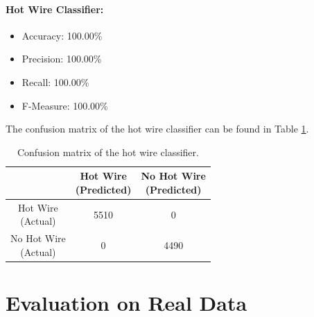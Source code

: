 \paragraph{Hot Wire Classifier:}
\begin{itemize}
  \item Accuracy: 100.00\%
  \item Precision: 100.00\%
  \item Recall: 100.00\%
  \item F-Measure: 100.00\%
\end{itemize}
The confusion matrix of the hot wire classifier can be found in Table
\ref{tbl:confusion-hotwire}.
\begin{table}[h]
  \centering
  \renewcommand\theadfont{\bfseries}
  \begin{tabular}{|c|c|c|}
    \hline
    & \thead{Hot Wire\\(Predicted)} & \thead{No Hot Wire\\(Predicted)} \\
    \hline
    \thead{Hot Wire\\(Actual)} & 5510 & 0\\
    \hline
    \thead{No Hot Wire\\(Actual)} & 0 & 4490\\
    \hline
  \end{tabular}
  \caption{Confusion matrix of the hot wire classifier.}
  \label{tbl:confusion-hotwire}
\end{table}

\section{Evaluation on Real Data}
